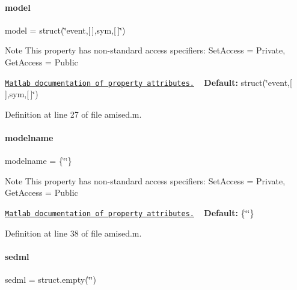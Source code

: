 \paragraph{\texorpdfstring{model}{model}}
{\footnotesize\ttfamily model = struct(\char`\"{}\textquotesingle{}event\textquotesingle{},\mbox{[}$\,$\mbox{]},\textquotesingle{}sym\textquotesingle{},\mbox{[}$\,$\mbox{]}\char`\"{})}

\begin{DoxyNote}{Note}
This property has non-\/standard access specifiers\+: {\ttfamily Set\+Access = Private, Get\+Access = Public} 

\href{http://www.mathworks.com/help/matlab/matlab_oop/property-attributes.html}{\tt Matlab documentation of property attributes.} ~\newline
{\bfseries Default\+:} struct(\char`\"{}\textquotesingle{}event\textquotesingle{},\mbox{[}$\,$\mbox{]},\textquotesingle{}sym\textquotesingle{},\mbox{[}$\,$\mbox{]}\char`\"{}) 
\end{DoxyNote}


Definition at line 27 of file amised.\+m.

\mbox{\label{classamised_a71bca9c21a6de42d8079ade31cb61044}} 
\paragraph{\texorpdfstring{modelname}{modelname}}
{\footnotesize\ttfamily modelname = \{\char`\"{}\char`\"{}\}}

\begin{DoxyNote}{Note}
This property has non-\/standard access specifiers\+: {\ttfamily Set\+Access = Private, Get\+Access = Public} 

\href{http://www.mathworks.com/help/matlab/matlab_oop/property-attributes.html}{\tt Matlab documentation of property attributes.} ~\newline
{\bfseries Default\+:} \{\char`\"{}\char`\"{}\} 
\end{DoxyNote}


Definition at line 38 of file amised.\+m.

\mbox{\label{classamised_a85ed334cf4c17568e28b725e3b755135}} 
\paragraph{\texorpdfstring{sedml}{sedml}}
{\footnotesize\ttfamily sedml = struct.\+empty(\char`\"{}\char`\"{})}

